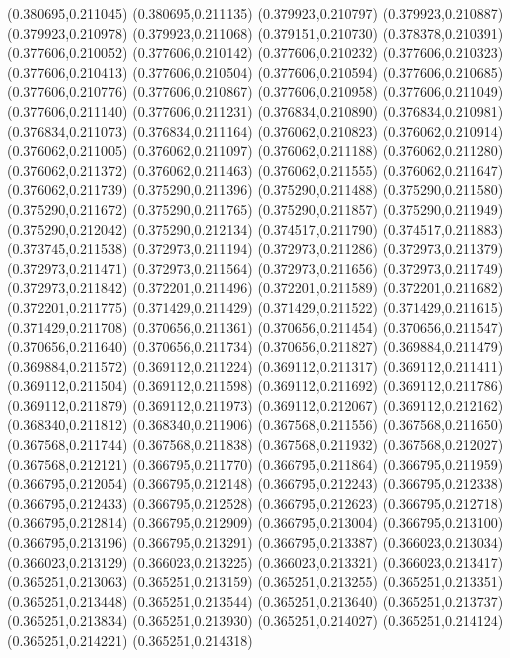 (0.380695,0.211045)
(0.380695,0.211135)
(0.379923,0.210797)
(0.379923,0.210887)
(0.379923,0.210978)
(0.379923,0.211068)
(0.379151,0.210730)
(0.378378,0.210391)
(0.377606,0.210052)
(0.377606,0.210142)
(0.377606,0.210232)
(0.377606,0.210323)
(0.377606,0.210413)
(0.377606,0.210504)
(0.377606,0.210594)
(0.377606,0.210685)
(0.377606,0.210776)
(0.377606,0.210867)
(0.377606,0.210958)
(0.377606,0.211049)
(0.377606,0.211140)
(0.377606,0.211231)
(0.376834,0.210890)
(0.376834,0.210981)
(0.376834,0.211073)
(0.376834,0.211164)
(0.376062,0.210823)
(0.376062,0.210914)
(0.376062,0.211005)
(0.376062,0.211097)
(0.376062,0.211188)
(0.376062,0.211280)
(0.376062,0.211372)
(0.376062,0.211463)
(0.376062,0.211555)
(0.376062,0.211647)
(0.376062,0.211739)
(0.375290,0.211396)
(0.375290,0.211488)
(0.375290,0.211580)
(0.375290,0.211672)
(0.375290,0.211765)
(0.375290,0.211857)
(0.375290,0.211949)
(0.375290,0.212042)
(0.375290,0.212134)
(0.374517,0.211790)
(0.374517,0.211883)
(0.373745,0.211538)
(0.372973,0.211194)
(0.372973,0.211286)
(0.372973,0.211379)
(0.372973,0.211471)
(0.372973,0.211564)
(0.372973,0.211656)
(0.372973,0.211749)
(0.372973,0.211842)
(0.372201,0.211496)
(0.372201,0.211589)
(0.372201,0.211682)
(0.372201,0.211775)
(0.371429,0.211429)
(0.371429,0.211522)
(0.371429,0.211615)
(0.371429,0.211708)
(0.370656,0.211361)
(0.370656,0.211454)
(0.370656,0.211547)
(0.370656,0.211640)
(0.370656,0.211734)
(0.370656,0.211827)
(0.369884,0.211479)
(0.369884,0.211572)
(0.369112,0.211224)
(0.369112,0.211317)
(0.369112,0.211411)
(0.369112,0.211504)
(0.369112,0.211598)
(0.369112,0.211692)
(0.369112,0.211786)
(0.369112,0.211879)
(0.369112,0.211973)
(0.369112,0.212067)
(0.369112,0.212162)
(0.368340,0.211812)
(0.368340,0.211906)
(0.367568,0.211556)
(0.367568,0.211650)
(0.367568,0.211744)
(0.367568,0.211838)
(0.367568,0.211932)
(0.367568,0.212027)
(0.367568,0.212121)
(0.366795,0.211770)
(0.366795,0.211864)
(0.366795,0.211959)
(0.366795,0.212054)
(0.366795,0.212148)
(0.366795,0.212243)
(0.366795,0.212338)
(0.366795,0.212433)
(0.366795,0.212528)
(0.366795,0.212623)
(0.366795,0.212718)
(0.366795,0.212814)
(0.366795,0.212909)
(0.366795,0.213004)
(0.366795,0.213100)
(0.366795,0.213196)
(0.366795,0.213291)
(0.366795,0.213387)
(0.366023,0.213034)
(0.366023,0.213129)
(0.366023,0.213225)
(0.366023,0.213321)
(0.366023,0.213417)
(0.365251,0.213063)
(0.365251,0.213159)
(0.365251,0.213255)
(0.365251,0.213351)
(0.365251,0.213448)
(0.365251,0.213544)
(0.365251,0.213640)
(0.365251,0.213737)
(0.365251,0.213834)
(0.365251,0.213930)
(0.365251,0.214027)
(0.365251,0.214124)
(0.365251,0.214221)
(0.365251,0.214318)
